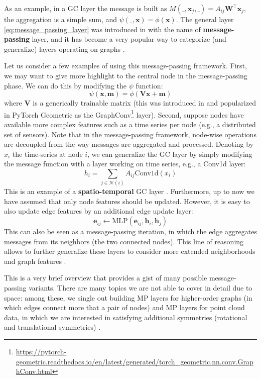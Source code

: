 As an example, in a GC layer the message is built as $M(\_, \mathbf{x}_j, \_)=A_{ij}\mathbf{W}^\top\mathbf{x}_j$, the aggregation is a simple sum, and $\psi(\_, \mathbf{x})=\phi(\mathbf{x})$. The general layer \eqref{eq:message_passing_layer} was introduced in \cite{gilmer2017neural} with the name of \textbf{message-passing} layer, and it has become a very popular way to categorize (and generalize) layers operating on graphs \cite{velivckovic2022message}.

Let us consider a few examples of using this message-passing framework. First, we may want to give more highlight to the central node in the message-passing phase. We can do this by modifying the $\psi$ function:
%
$$
\psi(\mathbf{x}, \mathbf{m})=\phi(\mathbf{V}\mathbf{x}+\mathbf{m})
$$
%
where $\mathbf{V}$ is a generically trainable matrix (this was introduced in \cite{morris2019weisfeiler} and popularized in PyTorch Geometric as the GraphConv\footnote{\url{https://pytorch-geometric.readthedocs.io/en/latest/generated/torch_geometric.nn.conv.GraphConv.html}} layer). Second, suppose nodes have available more complex features such as a time series per node (e.g., a distributed set of sensors). Note that in the message-passing framework, node-wise operations are decoupled from the way messages are aggregated and processed. Denoting by $x_i$ the time-series at node $i$, we can generalize the GC layer by simply modifying the message function with a layer working on time series, e.g., a Conv1d layer:
%
$$
h_i=\sum_{j \in \mathcal{N}(i)} A_{ij} \text{Conv1d}(x_i)
$$
%
This is an example of a \textbf{spatio-temporal} GC layer \cite{yu2017spatio}. Furthermore, up to now we have assumed that only node features should be updated. However, it is easy to also update edge features by an additional edge update layer:
%
$$
\mathbf{e}_{ij} \leftarrow\text{MLP}(\mathbf{e}_{ij},\mathbf{h}_i, \mathbf{h}_j)
$$
%
This can also be seen as a message-passing iteration, in which the edge aggregates messages from its neighbors (the two connected nodes). This line of reasoning allows to further generalize these layers to consider more extended neighborhoods and graph features \cite{battaglia2018relational}.

This is a very brief overview that provides a gist of many possible message-passing variants. There are many topics we are not able to cover in detail due to space: among these, we single out building MP layers for higher-order graphs (in which edges connect more that a pair of nodes) \cite{chien2021you} and MP layers for point cloud data, in which we are interested in satisfying additional symmetries (rotational and translational symmetries) \cite{satorras2021n,eijkelboom2023n}.

